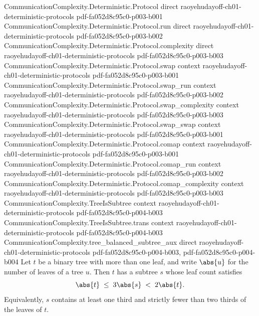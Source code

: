\begin{theorem}
\label{CommunicationComplexity.tree_balanced_subtree}
\leanok
{}
\proofstep
  {CommunicationComplexity.Deterministic.Protocol}
  {direct}
  {raoyehudayoff-ch01-deterministic-protocols}
  {pdf-fa052d8c95c0-p003-b001}
\proofstep
  {CommunicationComplexity.Deterministic.Protocol.run}
  {direct}
  {raoyehudayoff-ch01-deterministic-protocols}
  {pdf-fa052d8c95c0-p003-b002}
\proofstep
  {CommunicationComplexity.Deterministic.Protocol.complexity}
  {direct}
  {raoyehudayoff-ch01-deterministic-protocols}
  {pdf-fa052d8c95c0-p003-b003}
\proofstep
  {CommunicationComplexity.Deterministic.Protocol.swap}
  {context}
  {raoyehudayoff-ch01-deterministic-protocols}
  {pdf-fa052d8c95c0-p003-b001}
\proofstep
  {CommunicationComplexity.Deterministic.Protocol.swap_run}
  {context}
  {raoyehudayoff-ch01-deterministic-protocols}
  {pdf-fa052d8c95c0-p003-b002}
\proofstep
  {CommunicationComplexity.Deterministic.Protocol.swap_complexity}
  {context}
  {raoyehudayoff-ch01-deterministic-protocols}
  {pdf-fa052d8c95c0-p003-b003}
\proofstep
  {CommunicationComplexity.Deterministic.Protocol.swap_swap}
  {context}
  {raoyehudayoff-ch01-deterministic-protocols}
  {pdf-fa052d8c95c0-p003-b001}
\proofstep
  {CommunicationComplexity.Deterministic.Protocol.comap}
  {context}
  {raoyehudayoff-ch01-deterministic-protocols}
  {pdf-fa052d8c95c0-p003-b001}
\proofstep
  {CommunicationComplexity.Deterministic.Protocol.comap_run}
  {context}
  {raoyehudayoff-ch01-deterministic-protocols}
  {pdf-fa052d8c95c0-p003-b002}
\proofstep
  {CommunicationComplexity.Deterministic.Protocol.comap_complexity}
  {context}
  {raoyehudayoff-ch01-deterministic-protocols}
  {pdf-fa052d8c95c0-p003-b003}
\proofstep
  {CommunicationComplexity.TreeIsSubtree}
  {context}
  {raoyehudayoff-ch01-deterministic-protocols}
  {pdf-fa052d8c95c0-p004-b003}
\proofstep
  {CommunicationComplexity.TreeIsSubtree.trans}
  {context}
  {raoyehudayoff-ch01-deterministic-protocols}
  {pdf-fa052d8c95c0-p004-b003}
\proofstep
  {CommunicationComplexity.tree_balanced_subtree_aux}
  {direct}
  {raoyehudayoff-ch01-deterministic-protocols}
  {pdf-fa052d8c95c0-p004-b003,
    pdf-fa052d8c95c0-p004-b004}
Let $t$ be a binary tree with more than one leaf, and write $\abs{u}$ for the number of
leaves of a tree $u$. Then $t$ has a subtree $s$ whose leaf count satisfies
\[
  \abs{t} \;\le\; 3\abs{s} \;<\; 2\abs{t}.
\]
Equivalently, $s$ contains at least one third and strictly fewer than two thirds of the
leaves of $t$.
\end{theorem}
